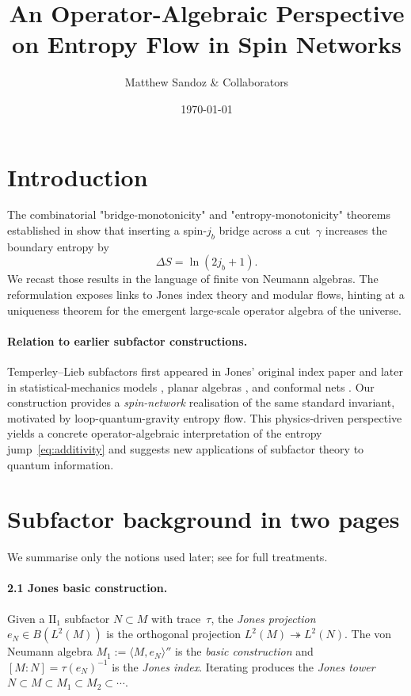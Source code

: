 \documentclass[11pt]{article}
\begin{document}
\title{An Operator-Algebraic Perspective on Entropy Flow in Spin Networks}
\author{\small Matthew Sandoz \& Collaborators}
\date{\today}
\maketitle

\section{Introduction}
The combinatorial "bridge-monotonicity" and "entropy-monotonicity" theorems
established in \cite{BridgeMono,EntropyMono}
show that inserting a spin-$j_b$ bridge across a cut~$\gamma$ increases the
boundary entropy by
\[
  \Delta S = \ln(2j_b+1).
\]
We recast those results in the language of finite von Neumann algebras.  
The reformulation exposes links to Jones index theory and modular flows, hinting
at a uniqueness theorem for the emergent large-scale operator algebra of the
universe.

\paragraph{Relation to earlier subfactor constructions.}
Temperley--Lieb subfactors first appeared in Jones’ original index
paper \cite{Jones1983} and later in statistical-mechanics models
\cite{KauffmanLins}, planar algebras \cite{JonesPA}, and conformal nets
\cite{KawahigashiLongo}.  
Our construction provides a \emph{spin-network} realisation of the same
standard invariant, motivated by loop-quantum-gravity entropy flow.
This physics‐driven perspective yields a concrete operator-algebraic
interpretation of the entropy jump~\eqref{eq:additivity} and suggests
new applications of subfactor theory to quantum information.

\section{Subfactor background in two pages}\label{sec:primer}
We summarise only the notions used later; see \cite{Jones1983, JonesPA,
PopaCBMS} for full treatments.

\paragraph{2.1  Jones basic construction.}
Given a $\mathrm{II}_1$ subfactor $N\subset M$ with trace~$\tau$, the
\emph{Jones projection} $e_N\in B(L^2(M))$ is the orthogonal projection
$L^2(M)\twoheadrightarrow L^2(N)$.  The von Neumann algebra
$M_1:=\langle M,e_N\rangle''$ is the \emph{basic construction} and
$[M:N]=\tau(e_N)^{-1}$ is the \emph{Jones index}.  Iterating produces the
\emph{Jones tower} $N\subset M\subset M_1\subset M_2\subset\cdots$.
\end{document}
